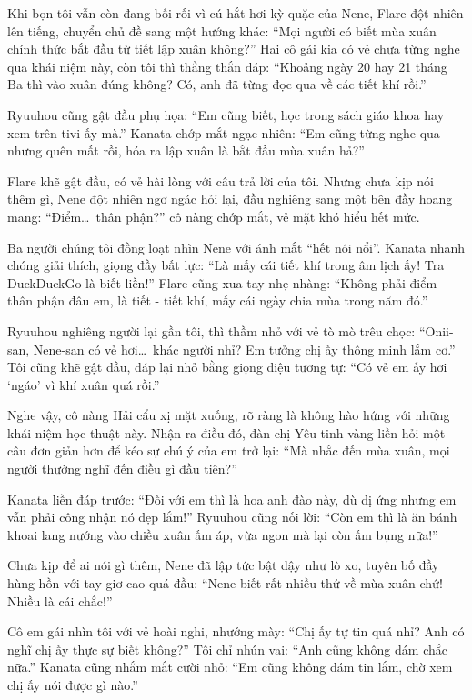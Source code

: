 \documentclass[../main.tex]{subfiles}
\begin{document}
Khi bọn tôi vẫn còn đang bối rối vì cú hắt hơi kỳ quặc của Nene, Flare đột nhiên lên tiếng, chuyển chủ đề sang một hướng khác: ``Mọi người có biết mùa xuân chính thức bắt đầu từ tiết lập xuân không?'' Hai cô gái kia có vẻ chưa từng nghe qua khái niệm này, còn tôi thì thẳng thắn đáp: ``Khoảng ngày 20 hay 21 tháng Ba thì vào xuân đúng không? Có, anh đã từng đọc qua về các tiết khí rồi.''

Ryuuhou cũng gật đầu phụ họa: ``Em cũng biết, học trong sách giáo khoa hay xem trên tivi ấy mà.'' Kanata chớp mắt ngạc nhiên: ``Em cũng từng nghe qua nhưng quên mất rồi, hóa ra lập xuân là bắt đầu mùa xuân hả?''

Flare khẽ gật đầu, có vẻ hài lòng với câu trả lời của tôi. Nhưng chưa kịp nói thêm gì, Nene đột nhiên ngơ ngác hỏi lại, đầu nghiêng sang một bên đầy hoang mang: ``Điểm\dots\ thân phận?'' cô nàng chớp mắt, vẻ mặt khó hiểu hết mức.

Ba người chúng tôi đồng loạt nhìn Nene với ánh mắt ``hết nói nổi''. Kanata nhanh chóng giải thích, giọng đầy bất lực: ``Là mấy cái tiết khí trong âm lịch ấy! Tra DuckDuckGo là biết liền!''
Flare cũng xua tay nhẹ nhàng: ``Không phải điểm thân phận đâu em, là tiết - tiết khí, mấy cái ngày chia mùa trong năm đó.''

Ryuuhou nghiêng người lại gần tôi, thì thầm nhỏ với vẻ tò mò trêu chọc: ``Onii-san, Nene-san có vẻ hơi\dots\ khác người nhỉ? Em tưởng chị ấy thông minh lắm cơ.'' Tôi cũng khẽ gật đầu, đáp lại nhỏ bằng giọng điệu tương tự: ``Có vẻ em ấy hơi `ngáo' vì khí xuân quá rồi.''

Nghe vậy, cô nàng Hải cẩu xị mặt xuống, rõ ràng là không hào hứng với những khái niệm học thuật này. Nhận ra điều đó, đàn chị Yêu tinh vàng liền hỏi một câu đơn giản hơn để kéo sự chú ý của em trở lại: ``Mà nhắc đến mùa xuân, mọi người thường nghĩ đến điều gì đầu tiên?''

Kanata liền đáp trước: ``Đối với em thì là hoa anh đào này, dù dị ứng nhưng em vẫn phải công nhận nó đẹp lắm!'' Ryuuhou cũng nối lời: ``Còn em thì là ăn bánh khoai lang nướng vào chiều xuân ấm áp, vừa ngon mà lại còn ấm bụng nữa!''

Chưa kịp để ai nói gì thêm, Nene đã lập tức bật dậy như lò xo, tuyên bố đầy hùng hồn với tay giơ cao quá đầu: ``Nene biết rất nhiều thứ về mùa xuân chứ! Nhiều là cái chắc!''

Cô em gái nhìn tôi với vẻ hoài nghi, nhướng mày: ``Chị ấy tự tin quá nhỉ? Anh có nghĩ chị ấy thực sự biết không?'' Tôi chỉ nhún vai: ``Anh cũng không dám chắc nữa.''
Kanata cũng nhắm mắt cười nhỏ: ``Em cũng không dám tin lắm, chờ xem chị ấy nói được gì nào.''
\end{document}
